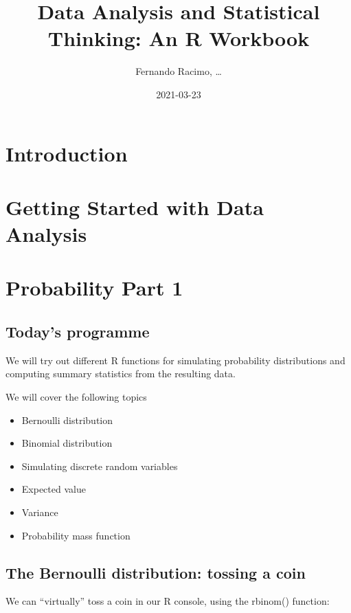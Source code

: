 \documentclass[
]{book}
\title{Data Analysis and Statistical Thinking: An R Workbook}
\author{Fernando Racimo, \ldots{}}
\date{2021-03-23}
\providecommand{\tightlist}{%
  \setlength{\itemsep}{0pt}\setlength{\parskip}{0pt}}
\begin{document}
\maketitle

{
\setcounter{tocdepth}{1}
\tableofcontents
}
\hypertarget{introduction}{%
\chapter{Introduction}\label{introduction}}

\hypertarget{intro}{%
\chapter{Getting Started with Data Analysis}\label{intro}}

\hypertarget{prob1}{%
\chapter{Probability Part 1}\label{prob1}}

\hypertarget{todays-programme}{%
\section{Today's programme}\label{todays-programme}}

We will try out different R functions for simulating probability distributions and computing summary statistics from the resulting data.

We will cover the following topics

\begin{itemize}
\tightlist
\item
  Bernoulli distribution
\item
  Binomial distribution
\item
  Simulating discrete random variables
\item
  Expected value
\item
  Variance
\item
  Probability mass function
\end{itemize}

\hypertarget{the-bernoulli-distribution-tossing-a-coin}{%
\section{The Bernoulli distribution: tossing a coin}\label{the-bernoulli-distribution-tossing-a-coin}}

We can ``virtually'' toss a coin in our R console, using the rbinom() function:
\end{document}
